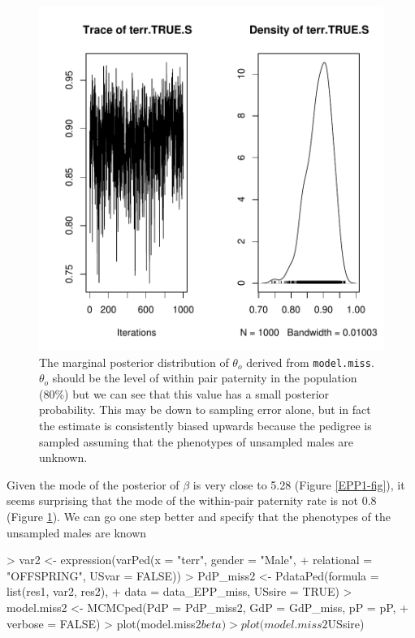 \documentclass{article}
\begin{document}
\begin{figure}[!h]
\begin{center}
\includegraphics{Tutorial-075}
\end{center}
\caption{The marginal posterior distribution of $\theta_{o}$ derived from \texttt{model.miss}.  $\theta_{o}$ should be the level of within pair paternity in the population (80\%) but we can see that this value has a small posterior probability.  This may be down to sampling error alone, but in fact the estimate is consistently biased upwards because the pedigree is sampled assuming that the phenotypes of unsampled males are unknown.}
\label{EPP1Test-fig}
\end{figure}

Given the mode of the posterior of $\beta$ is very close to 5.28 (Figure \ref{EPP1-fig}), it seems surprising that the mode of the within-pair paternity rate is not 0.8 (Figure \ref{EPP1Test-fig}). We can go one step better and specify that the phenotypes of the unsampled males are known 

\begin{Schunk}
\begin{Sinput}
> var2 <- expression(varPed(x = "terr", gender = "Male", 
+     relational = "OFFSPRING", USvar = FALSE))
> PdP_miss2 <- PdataPed(formula = list(res1, var2, res2), 
+     data = data_EPP_miss, USsire = TRUE)
> model.miss2 <- MCMCped(PdP = PdP_miss2, GdP = GdP_miss, pP = pP, 
+     verbose = FALSE)
> plot(model.miss2$beta)
> plot(model.miss2$USsire)
\end{Sinput}
\end{Schunk}
\end{document}
